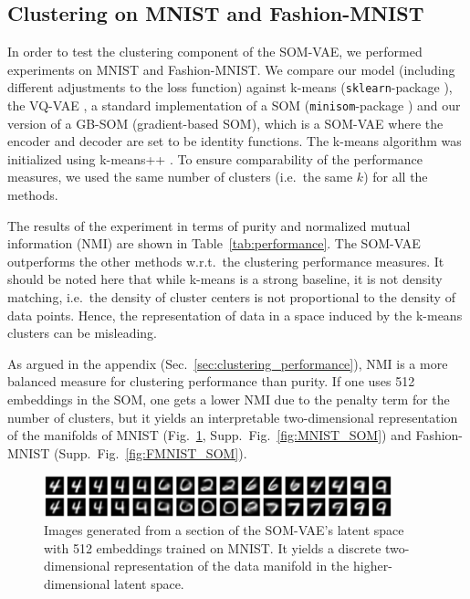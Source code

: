 \subsection{Clustering on MNIST and Fashion-MNIST}\label{sec:clustering_benchmark}

In order to test the clustering component of the SOM-VAE, we performed experiments on MNIST and Fashion-MNIST.
We compare our model (including different adjustments to the loss function) against k-means \citep{Lloyd1982} (\texttt{sklearn}-package \citep{Pedregosa2011}), the VQ-VAE \citep{Oord2017}, a standard implementation of a SOM (\texttt{minisom}-package \citep{Vettigli2017}) and our version of a GB-SOM (gradient-based SOM), which is a SOM-VAE where the encoder and decoder are set to be identity functions.
The k-means algorithm was initialized using k-means++ \citep{Arthur2007-rk}.
To ensure comparability of the performance measures, we used the same number of clusters (i.e.\ the same $k$) for all the methods.

The results of the experiment in terms of purity and normalized mutual information (NMI) are shown in Table~\ref{tab:performance}.
The SOM-VAE outperforms the other methods w.r.t.\ the clustering performance measures.
It should be noted here that while k-means is a strong baseline, it is not density matching, i.e.\ the density of cluster centers is not proportional to the density of data points.
Hence, the representation of data in a space induced by the k-means clusters can be misleading.

As argued in the appendix (Sec.~\ref{sec:clustering_performance}), NMI is a more balanced measure for clustering performance than purity.
If one uses 512 embeddings in the SOM, one gets a lower NMI due to the penalty term for the number of clusters, but it yields an interpretable two-dimensional representation of the manifolds of MNIST (Fig.~\ref{fig:MNIST_SOM_selection}, Supp.~Fig.~\ref{fig:MNIST_SOM}) and Fashion-MNIST (Supp.\ Fig.~\ref{fig:FMNIST_SOM}).

\begin{figure}
    \centering
    \includegraphics[width=0.9\textwidth]{MNIST_somvae_selection.pdf}
    \caption{Images generated from a section of the SOM-VAE's latent space with 512 embeddings trained on MNIST. It yields a discrete two-dimensional representation of the data manifold in the higher-dimensional latent space.}
    \label{fig:MNIST_SOM_selection}
\end{figure}

